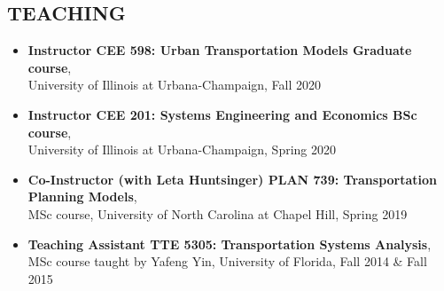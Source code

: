 \documentclass[margin,line]{resume}
\begin{document}
\begin{resume}


\section{\mysidestyle \bf TEACHING}
  \vspace{0pt}
\begin{itemize}
	\item {\bf Instructor CEE 598: Urban Transportation Models Graduate course}, \\
	University of Illinois at Urbana-Champaign, Fall 2020
	\item {\bf Instructor CEE 201: Systems Engineering and Economics BSc course}, \\
	University of Illinois at Urbana-Champaign, Spring 2020
	\item {\bf Co-Instructor (with Leta Huntsinger) PLAN 739: Transportation Planning Models}, \\
	MSc course, University of North Carolina at Chapel Hill, Spring 2019
	\item  \textbf{Teaching Assistant TTE 5305: Transportation Systems Analysis}, \\
	MSc course taught by Yafeng Yin, University of Florida, Fall 2014 & Fall 2015
	\end{itemize}
	

\end{resume}
\end{document}
